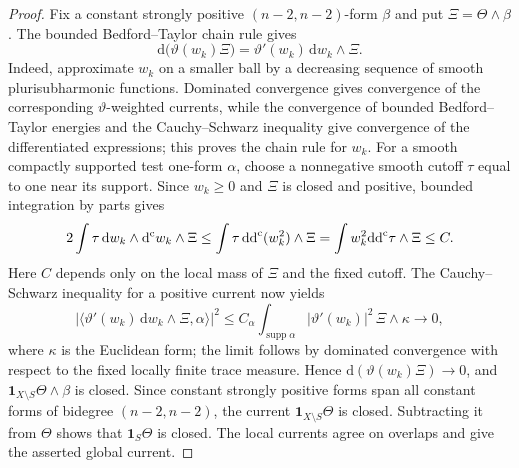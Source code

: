 \begin{proof}
Fix a constant strongly positive $(n-2,n-2)$-form $\beta$ and put $\Xi=\Theta\wedge\beta$. The bounded Bedford--Taylor chain rule gives
\[
 \mathrm d\bigl(\vartheta(w_k)\Xi\bigr)
       =\vartheta'(w_k)\,\mathrm dw_k\wedge\Xi.
\]
Indeed, approximate $w_k$ on a smaller ball by a decreasing sequence of smooth plurisubharmonic functions. Dominated convergence gives convergence of the corresponding $\vartheta$-weighted currents, while the convergence of bounded Bedford--Taylor energies and the Cauchy--Schwarz inequality give convergence of the differentiated expressions; this proves the chain rule for $w_k$. For a smooth compactly supported test one-form $\alpha$, choose a nonnegative smooth cutoff $\tau$ equal to one near its support. Since $w_k\geq0$ and $\Xi$ is closed and positive, bounded integration by parts gives
\[
 2\int\tau\,\mathrm dw_k\wedge\mathrm d^{\mathrm c} w_k\wedge\Xi
       \leq\int\tau\,\mathrm{dd}^{\mathrm{c}}(w_k^2)\wedge\Xi
       =\int w_k^2\mathrm{dd}^{\mathrm{c}}\tau\wedge\Xi\leq C.
\]
Here $C$ depends only on the local mass of $\Xi$ and the fixed cutoff. The Cauchy--Schwarz inequality for a positive current now yields
\[
 \bigl|\langle\vartheta'(w_k)\,\mathrm dw_k\wedge\Xi,
                    \alpha\rangle\bigr|^2
       \leq C_\alpha\int_{\operatorname{supp}\alpha}
                 |\vartheta'(w_k)|^2\,\Xi\wedge\kappa
       \longrightarrow0,
\]
where $\kappa$ is the Euclidean form; the limit follows by dominated convergence with respect to the fixed locally finite trace measure. Hence $\mathrm d(\vartheta(w_k)\Xi)\to0$, and $\mathbf1_{X\setminus S}\Theta\wedge\beta$ is closed. Since constant strongly positive forms span all constant forms of bidegree $(n-2,n-2)$, the current $\mathbf1_{X\setminus S}\Theta$ is closed. Subtracting it from $\Theta$ shows that $\mathbf1_S\Theta$ is closed. The local currents agree on overlaps and give the asserted global current.
\end{proof}
